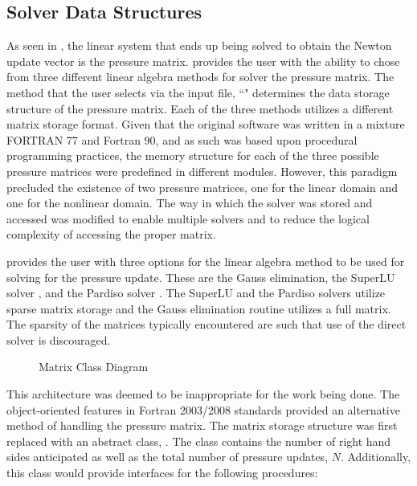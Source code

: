 \subsection{Solver Data Structures}
\label{subsect:domDecompSolverStructs}

As seen in , the linear system that ends up being solved to obtain the Newton update vector is the pressure matrix.
\cobra{} provides the user with the ability to chose from three different linear algebra methods for solver the pressure matrix.
The method that the user selects via the \cobra{} input file, ``" determines the data storage structure of the pressure matrix.
Each of the three methods utilizes a different matrix storage format.
Given that the original software was written in a mixture FORTRAN 77 and Fortran 90, and as such was based upon procedural programming practices, the memory structure for each of the three possible pressure matrices were predefined in different modules.
However, this paradigm precluded the existence of two pressure matrices, one for the linear domain and one for the nonlinear domain.
The way in which the solver was stored and accessed was modified to enable multiple solvers and to reduce the logical complexity of accessing the proper matrix.

\cobra{} provides the user with three options for the linear algebra method to be used for solving for the pressure update.
These are the Gauss elimination, the SuperLU solver \cite{Li1999}, and the Pardiso solver \cite{Schenk2006, Schenk2007}.
The SuperLU and the Pardiso solvers utilize sparse matrix storage and the Gauss elimination routine utilizes a full matrix.
The sparsity of the matrices typically encountered are such that use of the direct solver is discouraged.

\begin{figure}[ht!]
\singlespace\centering

\caption{Matrix Class Diagram}
\label{fig:matrixClassDiagram}
\end{figure}

This architecture was deemed to be inappropriate for the work being done.
The object-oriented features in Fortran 2003/2008 standards provided an alternative method of handling the pressure matrix.
The matrix storage structure was first replaced with an abstract class, .
The  class contains the number of right hand sides anticipated as well as the total number of pressure updates, $N$.
Additionally, this class would provide interfaces for the following procedures:

